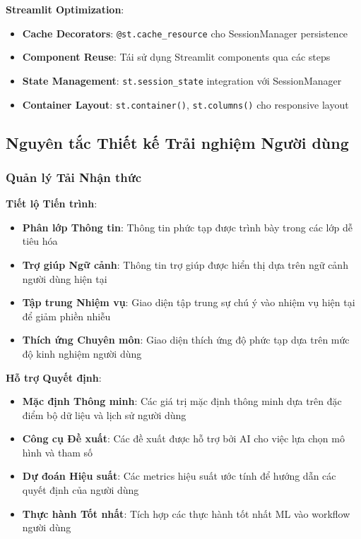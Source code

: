 \textbf{Streamlit Optimization}:
\begin{itemize}
    \item \textbf{Cache Decorators}: \texttt{@st.cache\_resource} cho SessionManager persistence
    \item \textbf{Component Reuse}: Tái sử dụng Streamlit components qua các steps
    \item \textbf{State Management}: \texttt{st.session\_state} integration với SessionManager
    \item \textbf{Container Layout}: \texttt{st.container()}, \texttt{st.columns()} cho responsive layout
\end{itemize}

\subsection{Nguyên tắc Thiết kế Trải nghiệm Người dùng}\label{subsec:ux-principles}

\subsubsection{Quản lý Tải Nhận thức}

\textbf{Tiết lộ Tiến trình}:
\begin{itemize}
    \item \textbf{Phân lớp Thông tin}: Thông tin phức tạp được trình bày trong các lớp dễ tiêu hóa
    \item \textbf{Trợ giúp Ngữ cảnh}: Thông tin trợ giúp được hiển thị dựa trên ngữ cảnh người dùng hiện tại
    \item \textbf{Tập trung Nhiệm vụ}: Giao diện tập trung sự chú ý vào nhiệm vụ hiện tại để giảm phiền nhiễu
    \item \textbf{Thích ứng Chuyên môn}: Giao diện thích ứng độ phức tạp dựa trên mức độ kinh nghiệm người dùng
\end{itemize}

\textbf{Hỗ trợ Quyết định}:
\begin{itemize}
    \item \textbf{Mặc định Thông minh}: Các giá trị mặc định thông minh dựa trên đặc điểm bộ dữ liệu và lịch sử người dùng
    \item \textbf{Công cụ Đề xuất}: Các đề xuất được hỗ trợ bởi AI cho việc lựa chọn mô hình và tham số
    \item \textbf{Dự đoán Hiệu suất}: Các metrics hiệu suất ước tính để hướng dẫn các quyết định của người dùng
    \item \textbf{Thực hành Tốt nhất}: Tích hợp các thực hành tốt nhất ML vào workflow người dùng
\end{itemize}

